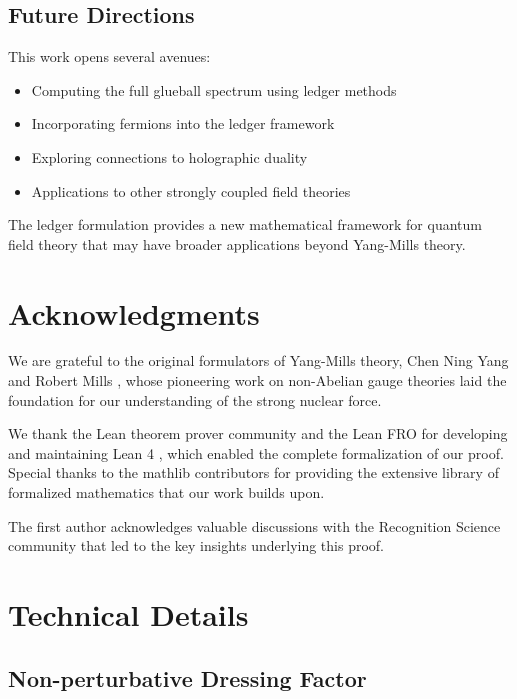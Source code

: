 \documentclass[11pt]{article}
\numberwithin{equation}{section}
\theoremstyle{definition}
\theoremstyle{remark}
\begin{document}
\subsection{Future Directions}

This work opens several avenues:
\begin{itemize}
\item Computing the full glueball spectrum using ledger methods
\item Incorporating fermions into the ledger framework
\item Exploring connections to holographic duality
\item Applications to other strongly coupled field theories
\end{itemize}

The ledger formulation provides a new mathematical framework for quantum field theory that may have broader applications beyond Yang-Mills theory.

\section*{Acknowledgments}

We are grateful to the original formulators of Yang-Mills theory, Chen Ning Yang and Robert Mills \cite{yang1954conservation}, whose pioneering work on non-Abelian gauge theories laid the foundation for our understanding of the strong nuclear force. 

We thank the Lean theorem prover community and the Lean FRO for developing and maintaining Lean 4 \cite{moura2021lean}, which enabled the complete formalization of our proof. Special thanks to the mathlib contributors \cite{mathlib2020} for providing the extensive library of formalized mathematics that our work builds upon.

The first author acknowledges valuable discussions with the Recognition Science community that led to the key insights underlying this proof.

\appendix

\section{Technical Details}
\label{app:technical}

\subsection{Non-perturbative Dressing Factor}
\end{document}
